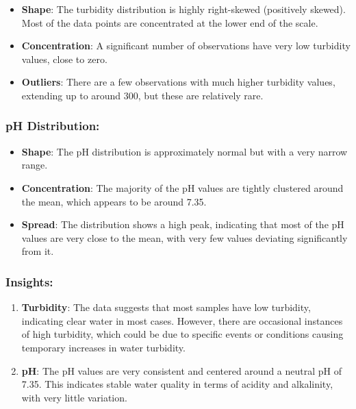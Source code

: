 \begin{itemize}
\tightlist
\item
  \textbf{Shape}: The turbidity distribution is highly right-skewed
  (positively skewed). Most of the data points are concentrated at the
  lower end of the scale.
\item
  \textbf{Concentration}: A significant number of observations have very
  low turbidity values, close to zero.
\item
  \textbf{Outliers}: There are a few observations with much higher
  turbidity values, extending up to around 300, but these are relatively
  rare.
\end{itemize}

\hypertarget{ph-distribution}{%
\subsubsection{pH Distribution:}\label{ph-distribution}}

\begin{itemize}
\tightlist
\item
  \textbf{Shape}: The pH distribution is approximately normal but with a
  very narrow range.
\item
  \textbf{Concentration}: The majority of the pH values are tightly
  clustered around the mean, which appears to be around 7.35.
\item
  \textbf{Spread}: The distribution shows a high peak, indicating that
  most of the pH values are very close to the mean, with very few values
  deviating significantly from it.
\end{itemize}

\hypertarget{insights}{%
\subsubsection{Insights:}\label{insights}}

\begin{enumerate}
\def\labelenumi{\arabic{enumi}.}
\tightlist
\item
  \textbf{Turbidity}: The data suggests that most samples have low
  turbidity, indicating clear water in most cases. However, there are
  occasional instances of high turbidity, which could be due to specific
  events or conditions causing temporary increases in water turbidity.
\item
  \textbf{pH}: The pH values are very consistent and centered around a
  neutral pH of 7.35. This indicates stable water quality in terms of
  acidity and alkalinity, with very little variation.
\end{enumerate}

